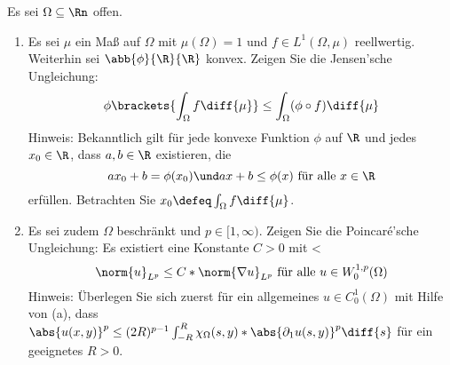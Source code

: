 \begin{exercisePage}
	\begin{exercise}
		Es sei $\Omega \subseteq \Rn$ offen.
		\begin{enumerate}
			\item Es sei $\mu$ ein Maß auf $\Omega$ mit $\mu(\Omega) = 1$ und $f \in L^1(\Omega, \mu)$ reellwertig. Weiterhin sei $\abb{\phi}{\R}{\R}$ konvex. Zeigen Sie die Jensen'sche Ungleichung:
			\begin{equation*}
				\phi \brackets{\int_\Omega f \diff{\mu}} \le \int_\Omega (\phi \circ f) \diff{\mu}
			\end{equation*}
			Hinweis: Bekanntlich gilt für jede konvexe Funktion $\phi$ auf $\R$ und jedes $x_0 \in \R$, dass $a,b \in \R$ existieren, die 
			\begin{equation*}
				ax_0 + b = \phi(x_0) \und ax + b \le \phi(x) \text{ für alle } x \in \R
			\end{equation*}
			erfüllen. Betrachten Sie $x_0 \defeq \int_\Omega f \diff{\mu}$.
			\item Es sei zudem $\Omega$ beschränkt und $p \in [1,\infty)$. Zeigen Sie die Poincaré'sche Ungleichung: Es existiert eine Konstante $C > 0$ mit <
			\begin{equation*}
				\norm{u}_{L^p} \le C * \norm{\nabla u}_{L^p} \text{ für alle } u \in W_0^{1,p}(\Omega)
			\end{equation*}
			Hinweis: Überlegen Sie sich zuerst für ein allgemeines $u \in C_0^1(\Omega)$  mit Hilfe von (a), dass $\abs{u(x,y)}^p \le (2R)^{p-1} \int_{-R}^R \chi_\Omega(s,y) * \abs{\partial_1 u(s,y)}^p \diff{s}$ für ein geeignetes $R > 0$.
		\end{enumerate}
	\end{exercise}


\end{exercisePage}
